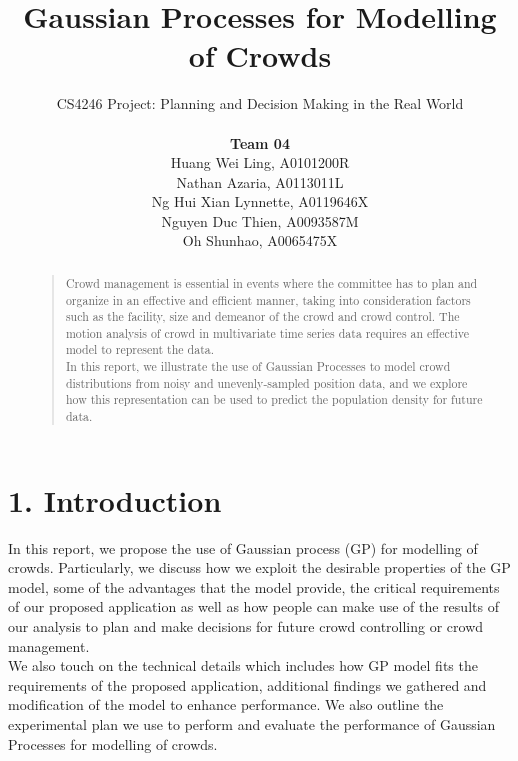 \documentclass[letterpaper]{article}
\begin{document}
%
\title{Gaussian Processes for Modelling of Crowds}
\author{CS4246 Project: Planning and Decision Making in the Real World  \\ \\
{\bf Team 04} \\
Huang Wei Ling, A0101200R\\
Nathan Azaria, A0113011L\\
Ng Hui Xian Lynnette, A0119646X\\
Nguyen Duc Thien, A0093587M\\
Oh Shunhao, A0065475X\\
}
\maketitle
\begin{abstract}
\begin{quote}
Crowd management is essential in events where the committee has to plan and organize in an effective and efficient manner, taking into consideration factors such as the facility, size and demeanor of the crowd and crowd control. The motion analysis of crowd in multivariate time series data requires an effective model to represent the data.\\
In this report, we illustrate the use of Gaussian Processes to model crowd distributions from noisy and unevenly-sampled position data, and we explore how this representation can be used to predict the population density for future data.
\end{quote}
\end{abstract}

\section{1.  Introduction}
In this report, we propose the use of Gaussian process (GP) for modelling of crowds. Particularly, we discuss how we exploit the desirable properties of the GP model, some of the advantages that the model provide, the critical requirements of our proposed application as well as how people can make use of the results of our analysis to plan and make decisions for future crowd controlling or crowd management. \\

We also touch on the technical details which includes how GP model fits the requirements of the proposed application, additional findings we gathered and modification of the model to enhance performance. We also outline the experimental plan we use to perform and evaluate the performance of Gaussian Processes for modelling of crowds. \\
\end{document}
